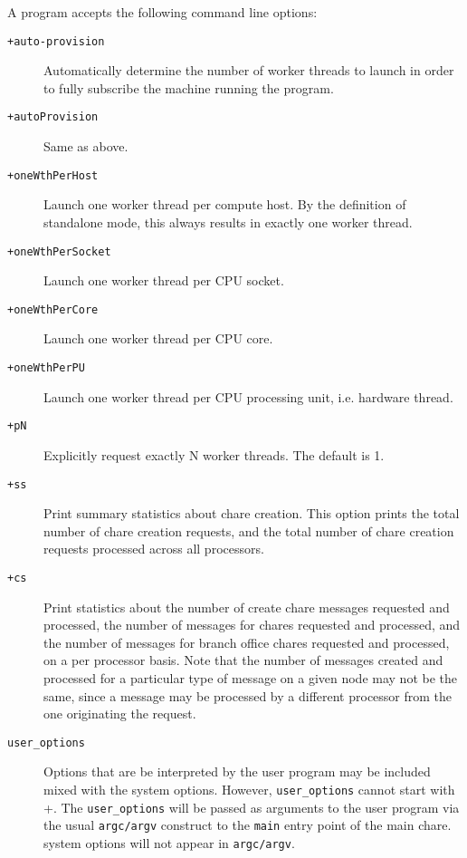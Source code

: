 A \charmpp{} program accepts the following command line options:
\begin{description}

\item[{\tt +auto-provision}] Automatically determine the number of worker
threads to launch in order to fully subscribe the machine running the program.

\item[{\tt +autoProvision}] Same as above.

\item[{\tt +oneWthPerHost}] Launch one worker thread per compute host. By
the definition of standalone mode, this always results in exactly one worker
thread.

\item[{\tt +oneWthPerSocket}] Launch one worker thread per CPU socket.

\item[{\tt +oneWthPerCore}] Launch one worker thread per CPU core.

\item[{\tt +oneWthPerPU}] Launch one worker thread per CPU processing unit,
i.e. hardware thread.

\item[{\tt +pN}] Explicitly request exactly N worker threads.
The default is 1.

\item[{\tt +ss}] Print summary statistics about chare creation.  This option
prints the total number of chare creation requests, and the total number of
chare creation requests processed across all processors.

\item[{\tt +cs}] Print statistics about the number of create chare messages
requested and processed, the number of messages for chares requested and
processed, and the number of messages for branch office chares requested and
processed, on a per processor basis.  Note that the number of messages
created and processed for a particular type of message on a given node
may not be the same, since a message may be processed by a different
processor from the one originating the request.

\item[{\tt user\_options}] Options that are be interpreted by the user
program may be included mixed with the system options.
However, {\tt user\_options} cannot start with +.
The {\tt user\_options} will be passed as arguments to the user program
via the usual {\tt argc/argv} construct to the {\tt main}
entry point of the main chare.
\charmpp{} system options will not appear in {\tt argc/argv}.

\end{description}



